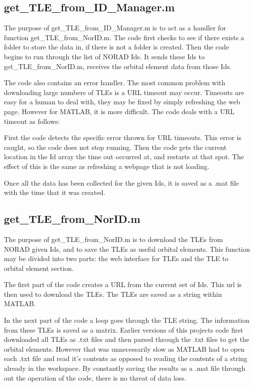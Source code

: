 \documentclass[12pt]{article}
\begin{document}
		\subsection{get\_TLE\_from\_ID\_Manager.m}
		The purpose of get\_TLE\_from\_ID\_Manager.m is to act as a handler for function \newline get\_TLE\_from\_NorID.m. The code first checks to see if there exists a folder to store the data in, if there is not a folder is created. Then the code begins to run through the list of NORAD Ids. It sends these Ids to get\_TLE\_from\_NorID.m, receives the orbital element data from those Ids. 
		
		The code also contains an error handler. The most common problem with downloading large numbers of TLEs is a URL timeout may occur. Timeouts are easy for a human to deal with, they may be fixed by simply refreshing the web page. However for MATLAB, it is more difficult. The code deals with a URL timeout as follows:
		
		First the code detects the specific error thrown for URL timeouts. This error is caught, so the code does not stop running. Then the code gets the current location in the Id array the time out occurred at, and restarts at that spot. The effect of this is the same as refreshing a webpage that is not loading. 
		
		Once all the data has been collected for the given Ids, it is saved as a .mat file with the time that it was created.
		\subsection{get\_TLE\_from\_NorID.m}
		The purpose of get\_TLE\_from\_NorID.m is to download the TLEs from NORAD given Ids, and to save the TLEs as useful orbital elements. This function may be divided into two parts: the web interface for TLEs and the TLE to orbital element section. 
		
		The first part of the code creates a URL from the current set of Ids. This url is then used to download the TLEs. The TLEs are saved as a string within MATLAB.  
		
		In the next part of the code a loop goes through the TLE string. The information from these TLEs is saved as a matrix. Earlier versions of this projects code first downloaded all TLEs as .txt files and then parsed through the .txt files to get the orbital elements. However that was unnecessarily slow as MATLAB had to open each .txt file and read it's contents as opposed to reading the contents of a string already in the workspace. By constantly saving the results as a .mat file through out the operation of the code, there is no threat of data loss. 
		
\end{document}
